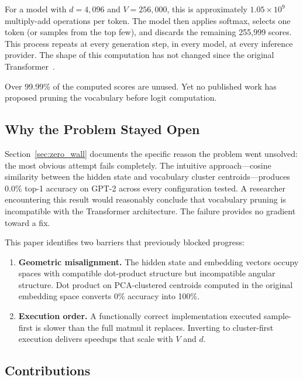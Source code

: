 \documentclass[11pt]{article}
\begin{document}
For a model with $d = 4{,}096$ and $V = 256{,}000$, this is approximately $1.05 \times 10^9$ multiply-add operations per token. The model then applies softmax, selects one token (or samples from the top few), and discards the remaining 255{,}999 scores. This process repeats at every generation step, in every model, at every inference provider. The shape of this computation has not changed since the original Transformer~\cite{vaswani2017attention}.

Over 99.99\% of the computed scores are unused. Yet no published work has proposed pruning the vocabulary before logit computation.

\subsection{Why the Problem Stayed Open}

Section~\ref{sec:zero_wall} documents the specific reason the problem went unsolved: the most obvious attempt fails completely. The intuitive approach---cosine similarity between the hidden state and vocabulary cluster centroids---produces 0.0\% top-1 accuracy on GPT-2 across every configuration tested. A researcher encountering this result would reasonably conclude that vocabulary pruning is incompatible with the Transformer architecture. The failure provides no gradient toward a fix.

This paper identifies two barriers that previously blocked progress:

\begin{enumerate}
    \item \textbf{Geometric misalignment.} The hidden state and embedding vectors occupy spaces with compatible dot-product structure but incompatible angular structure. Dot product on PCA-clustered centroids computed in the original embedding space converts 0\% accuracy into 100\%.
    \item \textbf{Execution order.} A functionally correct implementation executed sample-first is slower than the full matmul it replaces. Inverting to cluster-first execution delivers speedups that scale with $V$ and $d$.
\end{enumerate}

\subsection{Contributions}
\end{document}
